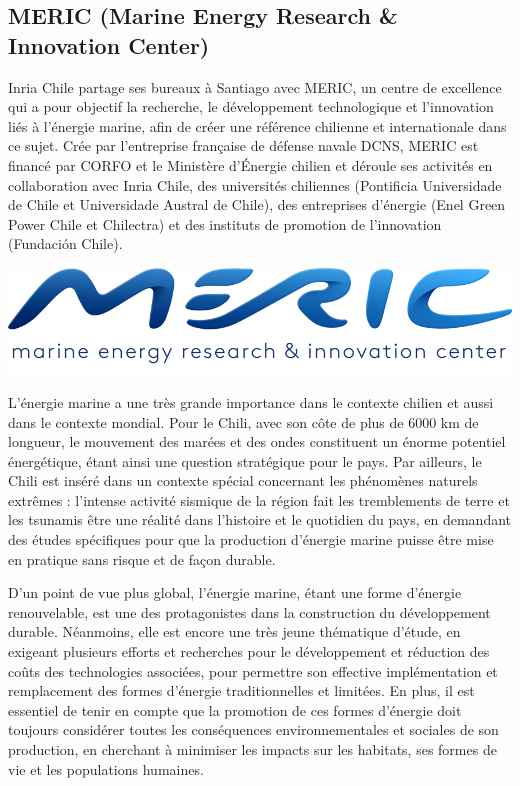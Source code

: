 \subsection*{MERIC (Marine Energy Research \& Innovation Center)}

\indent Inria Chile partage ses bureaux à Santiago avec MERIC, un centre de excellence qui a pour objectif la recherche, le développement technologique et l'innovation liés à l'énergie marine, afin de créer une référence chilienne et internationale dans ce sujet. Crée par l'entreprise française de défense navale DCNS, MERIC est financé par CORFO et le Ministère d'Énergie chilien et déroule ses activités en collaboration avec Inria Chile, des universités chiliennes (Pontificia Universidade de Chile et Universidade Austral de Chile), des entreprises d'énergie (Enel Green Power Chile et Chilectra) et des instituts de promotion de l'innovation (Fundación Chile).  

\indent

\indent

\begingroup
\centering
\includegraphics[scale=.3]{figures/logos/meric.png}
\endgroup

\indent L'énergie marine a une très grande importance dans le contexte chilien et aussi dans le contexte mondial. Pour le Chili, avec son côte de plus de 6000 km de longueur, le mouvement des marées et des ondes constituent un énorme potentiel énergétique, étant ainsi une question stratégique pour le pays. Par ailleurs, le Chili est inséré dans un contexte spécial concernant les phénomènes naturels extrêmes : l'intense activité sismique de la région fait les tremblements de terre et les tsunamis être une réalité dans l'histoire et le quotidien du pays, en demandant des études spécifiques pour que la production d'énergie marine puisse être mise en pratique sans risque et de façon durable.

\indent D'un point de vue plus global, l'énergie marine, étant une forme d'énergie renouvelable, est une des protagonistes dans la construction du développement durable. Néanmoins, elle est encore une très jeune thématique d'étude, en exigeant plusieurs efforts et recherches pour le développement et réduction des coûts des technologies associées, pour permettre son effective implémentation et remplacement des formes d'énergie traditionnelles et limitées. En plus, il est essentiel de tenir en compte que la promotion de ces formes d'énergie doit toujours considérer toutes les conséquences environnementales et sociales de son production, en cherchant à minimiser les impacts sur les habitats, ses formes de vie et les populations humaines.

